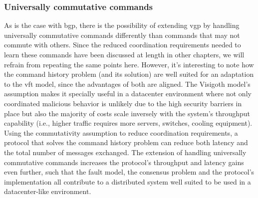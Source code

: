 \subsubsection{Universally commutative commands}
As is the case with \acrlong{bgp}, there is the possibility of extending \acrshort{vgp} by handling universally commutative commands differently than commands that may not commute with others. Since the reduced coordination requirements needed to learn these commands have been discussed at length in other chapters, we will refrain from repeating the same points here. However, it's interesting to note how the command history problem (and its solution) are well suited for an adaptation to the \acrshort{vft} model, since the advantages of both are aligned. The Visigoth model's assumption makes it specially useful in a datacenter environment where not only coordinated malicious behavior is unlikely due to the high security barriers in place but also the majority of costs scale inversely with the system's throughput capability (i.e., higher traffic requires more servers, switches, cooling equipment). Using the commutativity assumption to reduce coordination requirements, a protocol that solves the command history problem can reduce both latency and the total number of messages exchanged. The extension of handling universally commutative commands increases the protocol's throughput and latency gains even further, such that the fault model, the consensus problem and the protocol's implementation all contribute to a distributed system well suited to be used in a datacenter-like environment.
